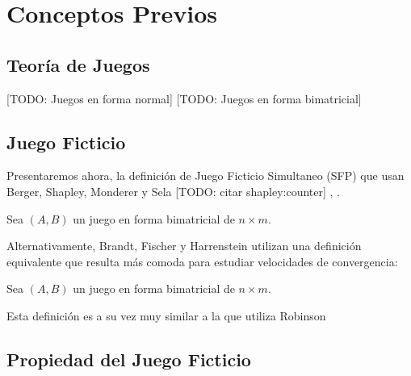 \chapter{Conceptos Previos}  \label{cap1}

\section{Teoría de Juegos}
[TODO: Juegos en forma normal]
[TODO: Juegos en forma bimatricial]

\section{Juego Ficticio}
Presentaremos ahora, la definición de Juego Ficticio Simultaneo (SFP) que usan Berger, Shapley, Monderer y Sela
\cite{browns:original} \cite{strategic:complementarities} [TODO: citar shapley:counter] \cite{no:cycling}, \cite{identical:interests}.


\begin{definition}
    Sea $(A, B)$ un juego en forma bimatricial de $n \times m$.
\end{definition}

Alternativamente, Brandt, Fischer y Harrenstein utilizan una definición equivalente que resulta más comoda para estudiar velocidades
de convergencia:

\begin{definition}
    Sea $(A, B)$ un juego en forma bimatricial de $n \times m$.
\end{definition}

Esta definición es a su vez muy similar a la que utiliza Robinson \cite{robinson:zerosum}
\section{Propiedad del Juego Ficticio}